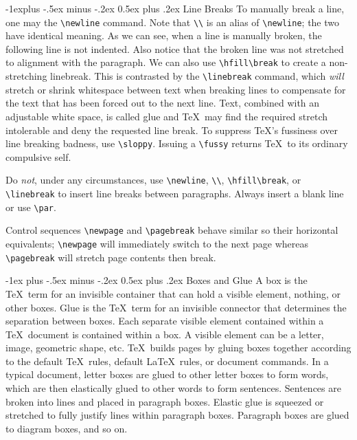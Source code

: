 \documentclass[10pt,landscape,letterpaper]{article}
\makeatletter
\renewcommand{\section}{\@startsection{section}{1}{0mm}%
	{.2ex}%
	{.2ex}%
	{\sffamily\bfseries}}
\renewcommand{\section}{\@startsection{section}{1}{0mm}%
	{-1ex plus -.5ex minus -.2ex}%
	{0.5ex plus .2ex}%
	{\normalfont\large\bfseries}}
\renewcommand{\subsection}{\@startsection{subsection}{2}{0mm}%
	{-1explus -.5ex minus -.2ex}%
	{0.5ex plus .2ex}%
	{\normalfont\normalsize\bfseries}}
\makeatother
\begin{document}
\begin{multicols*}{3}
\subsection{Line Breaks}
To manually break a line, one may the \verb|\newline| command. Note that \verb|\\| is an alias of \verb|\newline|; the two have identical meaning. As we can see, when a line \newline is manually broken, the following line is not indented. Also notice that the broken line was not stretched to alignment with the paragraph. We can also use \verb|\hfill\break| to create a non-stretching linebreak. This is contrasted by the \verb|\linebreak| command, which \textit{will} stretch or shrink whitespace between text when \linebreak breaking lines to compensate for the text that has been forced out to the next line. Text, combined with an adjustable white space, is called glue and \TeX\ may find the required stretch intolerable and deny the requested line break. To suppress \TeX's fussiness over line breaking badness, use \verb|\sloppy|. Issuing a \verb|\fussy| returns \TeX\ to its ordinary compulsive self.

Do \textit{not}, under any circumstances, use \verb|\newline|, \verb|\\|, \verb|\hfill\break|, or \verb|\linebreak| to insert line breaks between paragraphs. Always insert a blank line or use \verb|\par|.

Control sequences \verb|\newpage| and \verb|\pagebreak| behave similar so their horizontal equivalents; \verb|\newpage| will immediately switch to the next page whereas \verb|\pagebreak| will stretch page contents then break.

\section{Boxes and Glue}
A box is the \TeX\ term for an invisible container that can hold a visible element, nothing, or other boxes. Glue is the \TeX\ term for an invisible connector that determines the separation between boxes. Each separate visible element contained within a \TeX\ document is contained within a box. A visible element can be a letter, image, geometric shape, etc. \TeX\ builds pages by gluing boxes together according to the default \TeX\ rules, default \LaTeX\ rules, or document commands. In a typical document, letter boxes are glued to other letter boxes to form words, which are then elastically glued to other words to form sentences. Sentences are broken into lines and placed in paragraph boxes. Elastic glue is squeezed or stretched to fully justify lines within paragraph boxes. Paragraph boxes are glued to diagram boxes, and so on.


\end{multicols*}
\end{document}
